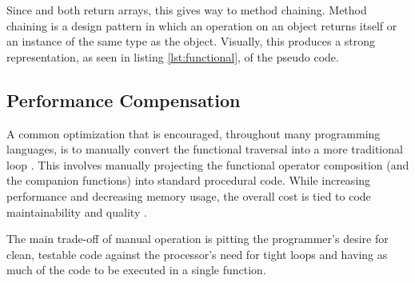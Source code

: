 Since  and  both return arrays, this gives way to method chaining. Method chaining is a design pattern in which an operation on an object returns itself or an instance of the same type as the object. Visually, this produces a strong representation, as seen in listing \ref{lst:functional}, of the pseudo code.

\begin{minipage}{\linewidth}

\end{minipage} 

\subsection{Performance Compensation}
A common optimization that is encouraged, throughout many programming languages, is to manually convert the functional traversal into a more traditional  loop \cite{iterperf09} \cite{iterperf10} \cite{iterperf11}.  This involves manually projecting the functional operator composition (and the companion functions) into standard procedural code.  While increasing performance and decreasing memory usage, the overall cost is tied to code maintainability and quality \cite{langstudy14}.  

The main trade-off of manual operation is pitting the programmer's desire for clean, testable code against the processor's need for tight loops and having as much of the code to be executed in a single function.  